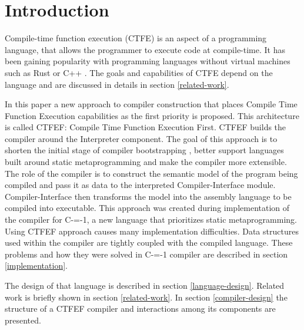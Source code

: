\section{Introduction}


Compile-time function execution (CTFE) is an aspect of a programming language, that allows the programmer to execute code at compile-time.
It has been gaining popularity with programming languages without virtual machines such as Rust \cite{rust} or C++ \cite{ISO:cpp98}.
The goals and capabilities of CTFE depend on the language and are discussed in details in section \ref{related-work}.

In this paper a new approach to compiler construction that places Compile Time Function Execution capabilities as the first priority is proposed.
This architecture is called CTFEF: Compile Time Function Execution First. CTFEF builds the compiler around the Interpreter component.
The goal of this approach is to shorten the initial stage of compiler bootstrapping \cite{puntambekar:compiler_design, novillo2007gcc}, better support languages built around static metaprogramming and make the compiler more extensible.
The role of the compiler is to construct the semantic model of the program being compiled and pass it as data to the interpreted Compiler-Interface module.
Compiler-Interface then transforms the model into the assembly language to be compiled into executable.
This approach was created during implementation of the compiler for C-=-1, a new language that prioritizes static metaprogramming.
Using CTFEF approach causes many implementation difficulties. Data structures used within the compiler are tightly coupled with the compiled language.
These problems and how they were solved in C-=-1 compiler are described in section \ref{implementation}.


The design of that language is described in section \ref{language-design}.
Related work is briefly shown in section \ref{related-work}.
In section \ref{compiler-design} the structure of a CTFEF compiler and interactions among its components are presented.
